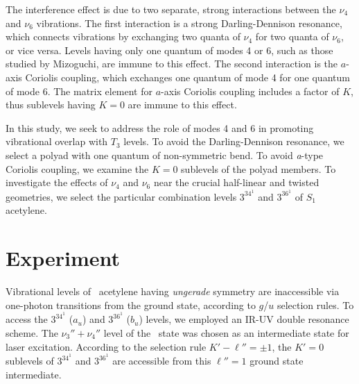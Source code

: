 \documentclass[12pt]{mitthesis}
\begin{document}
The interference effect is due to two separate, strong interactions
between the $\nu_4$ and $\nu_6$ vibrations.  The first interaction is
a strong Darling-Dennison resonance, which connects vibrations by
exchanging two quanta of $\nu_4$ for two quanta of $\nu_6$, or vice
versa.  Levels having only one quantum of modes 4 or 6, such as those
studied by Mizoguchi, are immune to this effect.  The second
interaction is the $a$-axis Coriolis coupling, which exchanges one
quantum of mode 4 for one quantum of mode 6.  The matrix element for
$a$-axis Coriolis coupling includes a factor of $K$, thus sublevels
having $K=0$ are immune to this effect.

In this study, we seek to address the role of modes 4 and 6 in
promoting vibrational overlap with $T_3$ levels.  To avoid the
Darling-Dennison resonance, we select a polyad with one quantum of
non-symmetric bend.  To avoid \emph{a}-type Coriolis coupling, we examine
the $K=0$ sublevels of the polyad members.  To investigate the effects
of $\nu_4$ and $\nu_6$ near the crucial half-linear and twisted
geometries, we select the particular combination levels $3^34^1$ and
$3^36^1$ of $S_1$ acetylene.





























\section{Experiment}

Vibrational levels of \astate\ acetylene having \emph{ungerade}
symmetry are inaccessible via one-photon transitions from the ground
state, according to $g$/$u$ selection rules.  To access the $3^34^1$
($a_u$) and $3^36^1$ ($b_u$) levels, we employed an IR-UV double
resonance scheme.  The $\nu_3''+\nu_4''$ level of the \xstate\ state
was chosen as an intermediate state for laser excitation.  According
to the selection rule $K'-\ell'' = \pm 1$, the $K'=0$ sublevels of
$3^34^1$ and $3^36^1$ are accessible from this $\ell''=1$ ground state
intermediate.
\end{document}
